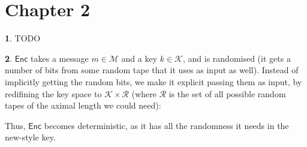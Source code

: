 \documentclass{article}
\theoremstyle{definition}
\newcommand{\Enc}{\mathsf{Enc}}
\newcommand{\Ms}{\mathcal{M}} %
\newcommand{\Ks}{\mathcal{K}} %
\theoremstyle{definition}
\theoremstyle{definition}
\newtheorem{solution-internal}{}[subsection]
\newenvironment{solution}{
  \begin{solution-internal}
}{
  \end{solution-internal}
}
\begin{document}
\section*{Chapter 2}
\setcounter{section}{2}
\setcounter{subsection}{2}
\setcounter{solution-internal}{0}
\begin{solution}
  TODO
\end{solution}
\begin{solution}
$\Enc$ takes a message $m \in \Ms$ and a key $k \in \Ks$, and is randomised (it
gets a number of bits from some random tape that it uses as input as well).
Instead of implicitly getting the random bits, we make it explicit passing them
as input, by redifining the key space to $\Ks \times \mathcal{R}$ (where
$\mathcal{R}$ is the set of all possible random tapes of the aximal length we
could need):

Thus, $\Enc$ becomes deterministic, as it has all the randomness it needs in the
new-style key.
\end{solution}
\end{document}
